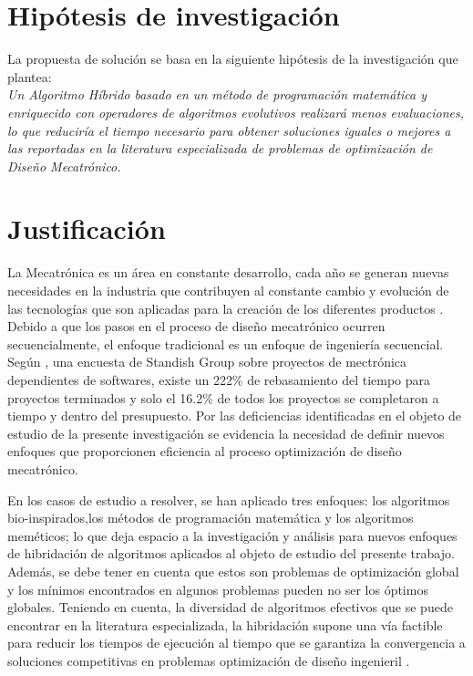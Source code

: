   \section{Hipótesis de investigación}
  La propuesta de solución se basa en la siguiente hipótesis de la investigación que plantea:\\
\textit{  Un Algoritmo Híbrido basado en un método de programación matemática y enriquecido con operadores de algoritmos evolutivos realizará menos evaluaciones, lo que reduciría el tiempo necesario para obtener soluciones iguales o mejores a las reportadas en la literatura especializada de problemas de optimización de Diseño Mecatrónico.}
  
  \section{Justificación}
  
  La Mecatrónica es un área en constante desarrollo, cada año se generan nuevas necesidades en la industria que contribuyen al constante cambio y evolución de las tecnologías que son aplicadas para la creación de los diferentes productos \cite{anandan_our_????} \cite{parulekar_why_2014} \cite{hagerty_meet_2015} \cite{ubm_electronics_design_????}.  Debido a que los pasos en el proceso de diseño mecatrónico ocurren secuencialmente, el enfoque tradicional es un enfoque de ingeniería secuencial. Según \cite{shetty_mechatronics_2010},  una encuesta de Standish Group sobre proyectos de mectrónica dependientes de softwares, existe un 222\% de rebasamiento del tiempo para proyectos terminados y solo el 16.2\% de todos los proyectos se completaron a tiempo y dentro del presupuesto. Por las deficiencias identificadas en el objeto de estudio de la presente investigación se evidencia la necesidad de definir nuevos enfoques que proporcionen eficiencia al proceso optimización de diseño mecatrónico.
  
  En los casos de estudio a resolver, se han aplicado tres enfoques: los algoritmos bio-inspirados,los métodos de programación matemática y los algoritmos meméticos; lo que deja espacio a la investigación y análisis para nuevos enfoques de hibridación de algoritmos aplicados al objeto de estudio del presente trabajo. Además, se debe tener en cuenta que estos son problemas de optimización global y los mínimos encontrados en algunos problemas pueden no ser los óptimos globales. Teniendo en cuenta, la diversidad de algoritmos efectivos que se puede encontrar en la literatura especializada, la hibridación supone una vía factible para reducir los tiempos de ejecución al tiempo que se garantiza la convergencia a soluciones competitivas en problemas optimización de diseño ingenieril \cite{sacco_metropolis_2008} \cite{koch_hybridization_2009}  \cite{jovanovic_cuckoo_2016}.
  
